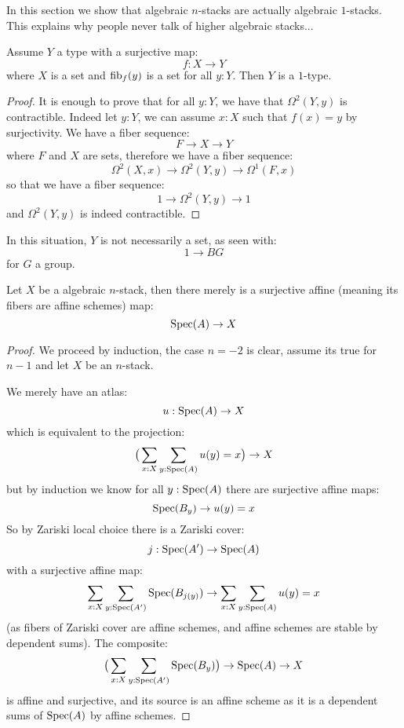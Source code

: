 In this section we show that algebraic $n$-stacks are actually algebraic $1$-stacks. This explains why people never talk of higher algebraic stacks...

\begin{lemma}\label{covering-with-sets-total-space}
Assume $Y$ a type with a surjective map:
\[f:X\to Y\]
where $X$ is a set and $\mathrm{fib}_f(y)$ is a set for all $y:Y$. Then $Y$ is a $1$-type.
\end{lemma}

\begin{proof}
It is enough to prove that for all $y:Y$, we have that $\Omega^2(Y,y)$ is contractible. Indeed let $y:Y$, we can assume $x:X$ such that $f(x)=y$ by surjectivity. We have a fiber sequence:
\[F\to X\to Y\]
where $F$ and $X$ are sets, therefore we have a fiber sequence:
\[\Omega^2(X,x) \to \Omega^2(Y,y) \to \Omega^1(F,x)\]
so that we have a fiber sequence:
\[1\to \Omega^2(Y,y)\to 1\]
and $\Omega^2(Y,y)$ is indeed contractible.
\end{proof}

\begin{remark}
In this situation, $Y$ is not necessarily a set, as seen with:
\[1\to BG\]
for $G$ a group.
\end{remark}

\begin{lemma}\label{n-stacks-affine-cover}
Let $X$ be a algebraic $n$-stack, then there merely is a surjective affine (meaning its fibers are affine schemes) map:
\[\operatorname{Spec}(A)\to X\]
\end{lemma}

\begin{proof}
We proceed by induction, the case $n=-2$ is clear, assume its true for $n-1$ and let $X$ be an $n$-stack.

We merely have an atlas:
\[u:\operatorname{Spec}(A)\to X\]
which is equivalent to the projection:
\[\big(\sum_{x:X}\sum_{y:\operatorname{Spec}(A)} u(y)=x\big) \to X\]
but by induction we know for all $y:\operatorname{Spec}(A)$ there are surjective affine maps:
\[\operatorname{Spec}(B_y)\to u(y)=x\] 
So by Zariski local choice there is a Zariski cover:
\[j:\operatorname{Spec}(A')\to \operatorname{Spec}(A)\]
with a surjective affine map:
\[\sum_{x:X}\sum_{y:\operatorname{Spec}(A')} \operatorname{Spec}(B_{j(y)}) \to \sum_{x:X}\sum_{y:\operatorname{Spec}(A)} u(y)=x\]
(as fibers of Zariski cover are affine schemes, and affine schemes are stable by dependent sums). The composite:
\[\big(\sum_{x:X}\sum_{y:\operatorname{Spec}(A')} \operatorname{Spec}(B_y) \big) \to \operatorname{Spec}(A) \to X\]
is affine and surjective, and its source is an affine scheme as it is a dependent sums of $\operatorname{Spec}(A)$ by affine schemes.
\end{proof}

